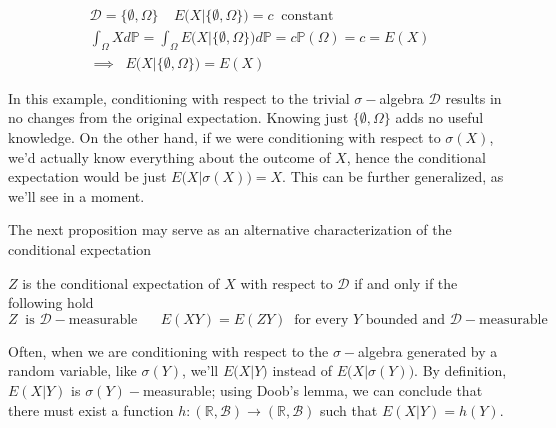 \begin{gather*}
    \mathcal{D} = \{ \emptyset, \Omega \} \;\;\;\; E\Big( X \vert \{ \emptyset, \Omega\} \Big) = c \;\; \text{constant} \\
    \int_{\Omega} X d \mathbb{P} = \int_{\Omega} E\big(X \vert \{\emptyset, \Omega\}\big) d \mathbb{P} = c \mathbb{P}(\Omega) = c = E(X) \\
    \implies \;\; E\big(X \vert \{\emptyset, \Omega \} \big) = E(X)
\end{gather*}

In this example, conditioning with respect to the trivial $\sigma-$algebra $\mathcal{D}$ results in no changes from the original expectation. Knowing just $\{ \emptyset,\Omega \}$ adds no useful knowledge. On the other hand, if we were conditioning with respect to $\sigma(X)$, we'd actually know everything about the outcome of $X$, hence the conditional expectation would be just $E\big(X \vert \sigma(X) \Big) = X$. This can be further generalized, as we'll see in a moment. 

The next proposition may serve as an alternative characterization of the conditional expectation

\begin{proposition}
    $Z$ is the conditional expectation of $X$ with respect to $\mathcal{D}$ if and only if the following hold
    \begin{equation*}
        Z \;\;\text{is $\mathcal{D}-$measurable} \;\;\;\;\;\; E(XY) = E(ZY) \;\; \text{for every $Y$ bounded and $\mathcal{D}-$measurable}
    \end{equation*}
\end{proposition}

Often, when we are conditioning with respect to the $\sigma-$algebra generated by a random variable, like $\sigma(Y)$, we'll $E\big(X \vert Y \big)$ instead of $E\big(X \vert \sigma(Y) \big)$. By definition, $E(X\vert Y)$ is $\sigma(Y)-$measurable; using Doob's lemma, we can conclude that there must exist a function $h : (\mathbb{R},\mathcal{B}) \to (\mathbb{R},\mathcal{B})$ such that $E(X\vert Y) = h(Y)$. 


